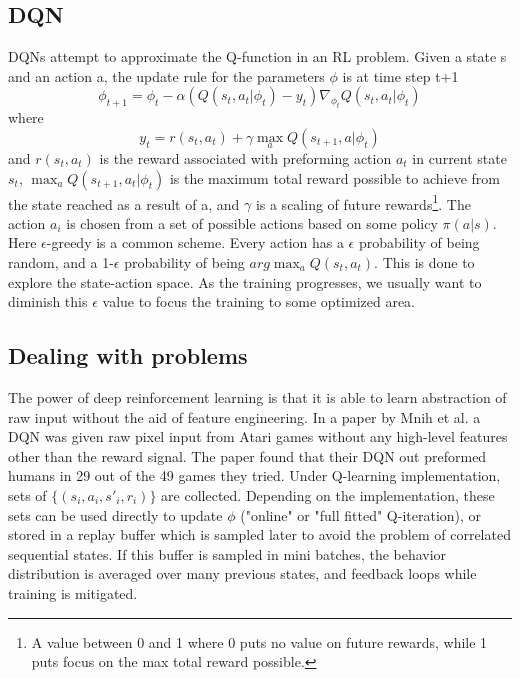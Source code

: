 \documentclass[a4paper,english]{report}
\begin{document}
\subsection{DQN}
DQNs attempt to approximate the Q-function in an RL problem.
Given a state s and an action a, the update rule for the parameters \(\phi\) is at time step t+1 
\begin{equation}\label{eq:qlearningupdate}
\phi_{t+1} = \phi_t - \alpha(Q(s_t, a_t|\phi_t)-y_t)\nabla_{\phi_t}Q(s_t,a_t|\phi_t)
\end{equation}
where
\begin{equation}
y_t = r(s_t, a_t) + \gamma\max_{a}Q(s_{t+1},a|\phi_t)
\end{equation}
and \(r(s_t, a_t)\) is the reward associated with preforming action \(a_t\) in current state \(s_t\), \(\max_{a}Q(s_{t+1}, a_t|\phi_t)\) is the maximum total reward possible to achieve from the state reached as a result of  a, and \(\gamma\) is a scaling of future rewards\footnote{A value between 0 and 1 where 0 puts no value on future rewards, while 1 puts focus on the max total reward possible.}. The action \(a_i\) is chosen from a set of possible actions based on some policy \(\pi(a|s)\). Here \(\epsilon\)-greedy is a common scheme. Every action has a \(\epsilon\) probability of being random, and a 1-\(\epsilon\) probability of being \(arg\max_{a}Q(s_t, a_t)\). This is done to explore the state-action space. As the training progresses, we usually want to diminish this \(\epsilon\) value to focus the training to some optimized area.

\subsection{Dealing with problems}
The power of deep reinforcement learning is that it is able to learn abstraction of raw input without the aid of feature engineering. In a paper by Mnih et al.\cite{deepmindatariHumanlevelcontrol} a DQN was given raw pixel input from Atari games without any high-level features other than the reward signal. The paper found that their DQN out preformed humans in 29 out of the 49 games they tried.    
Under Q-learning implementation, sets of \(\{(s_i, a_i, s'_i, r_i)\}\) are collected. Depending on the implementation, these sets can be used directly to update \(\phi\) ("online" or "full fitted" Q-iteration), or stored in a replay buffer which is sampled later to avoid the problem of correlated sequential states. If this buffer is sampled in mini batches, the behavior distribution is averaged over many previous states, and feedback loops while training is mitigated.\cite{deepRLslide}
\end{document}
